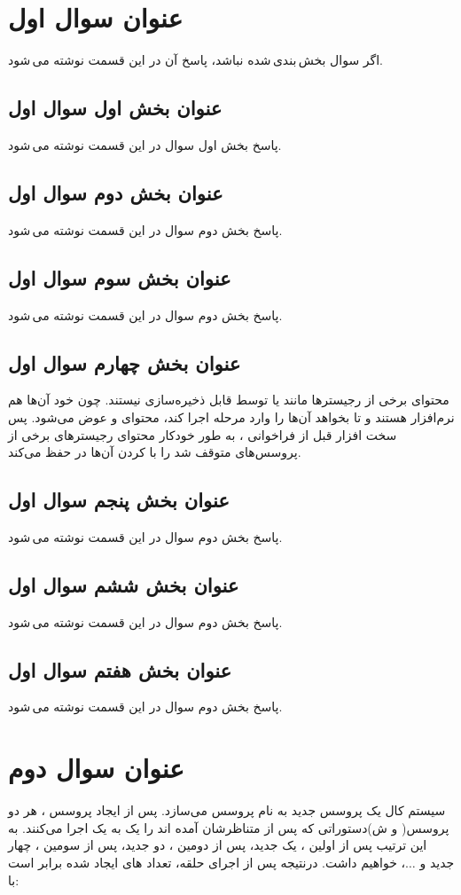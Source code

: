 \documentclass{article}
\begin{document}


\tableofcontents
\newpage

\section{عنوان سوال اول}
اگر سوال بخش\,بندی\,شده نباشد، پاسخ آن در این قسمت نوشته می\,شود.
\subsection{عنوان بخش اول سوال اول}
پاسخ بخش اول سوال در این قسمت نوشته می\,شود.
\subsection{عنوان بخش دوم سوال اول}
پاسخ بخش دوم سوال در این قسمت نوشته می\,شود.
\subsection{عنوان بخش سوم سوال اول}
پاسخ بخش دوم سوال در این قسمت نوشته می\,شود.
\subsection{عنوان بخش چهارم سوال اول}
محتوای برخی از رجیستر‌ها مانند  یا  توسط  قابل ذخیره‌سازی نیستند. چون خود آن‌ها هم نرم‌افزار هستند و تا  بخواهد آن‌ها را وارد مرحله اجرا کند، محتوای  و  عوض می‌شود. پس سخت افزار قبل از فراخوانی  ، به طور خودکار محتوای رجیستر‌های برخی از پروسس‌های متوقف شد را با  کردن آن‌ها در  حفظ می‌کند.
\subsection{عنوان بخش پنجم سوال اول}
پاسخ بخش دوم سوال در این قسمت نوشته می\,شود.
\subsection{عنوان بخش ششم سوال اول}
پاسخ بخش دوم سوال در این قسمت نوشته می\,شود.
\subsection{عنوان بخش هفتم سوال اول}
پاسخ بخش دوم سوال در این قسمت نوشته می\,شود.

\section{عنوان سوال دوم}
\indent
سیستم کال  یک پروسس جدید به نام پروسس  می‌سازد. پس از ایجاد پروسس ، هر دو پروسس( و ش)دستوراتی که پس از  متناظرشان آمده اند را یک به یک اجرا می‌کنند. به این ترتیب پس از اولین ، یک  جدید، پس از دومین ، دو  جدید، پس از سومین ، چهار  جدید و $\ldots$، خواهیم داشت. درنتیجه پس از اجرای حلقه، تعداد های ایجاد شده برابر است با:
\end{document}
